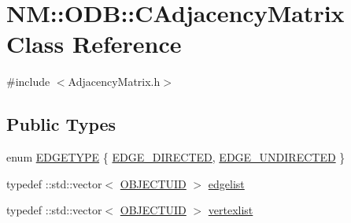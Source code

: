 \hypertarget{class_n_m_1_1_o_d_b_1_1_c_adjacency_matrix}{}\section{N\+M\+:\+:O\+D\+B\+:\+:C\+Adjacency\+Matrix Class Reference}
\label{class_n_m_1_1_o_d_b_1_1_c_adjacency_matrix}


{\ttfamily \#include $<$Adjacency\+Matrix.\+h$>$}

\subsection*{Public Types}
\begin{DoxyCompactItemize}
\item 
enum \hyperlink{class_n_m_1_1_o_d_b_1_1_c_adjacency_matrix_aa4f68c561981e4e158dec4a4a9a97093}{E\+D\+G\+E\+T\+Y\+P\+E} \{ \hyperlink{class_n_m_1_1_o_d_b_1_1_c_adjacency_matrix_aa4f68c561981e4e158dec4a4a9a97093a1817cdb4e014f88e7c6794db0504e9ad}{E\+D\+G\+E\+\_\+\+D\+I\+R\+E\+C\+T\+E\+D}, 
\hyperlink{class_n_m_1_1_o_d_b_1_1_c_adjacency_matrix_aa4f68c561981e4e158dec4a4a9a97093a538d2110c4fc4fac7461bc240c86a89e}{E\+D\+G\+E\+\_\+\+U\+N\+D\+I\+R\+E\+C\+T\+E\+D}
 \}
\item 
typedef \+::std\+::vector$<$ \hyperlink{namespace_n_m_1_1_o_d_b_a262b64fab56baaa96e18bac4ada88265}{O\+B\+J\+E\+C\+T\+U\+I\+D} $>$ \hyperlink{class_n_m_1_1_o_d_b_1_1_c_adjacency_matrix_ab898e602bacf35a9600621408c1fde25}{edgelist}
\item 
typedef \+::std\+::vector$<$ \hyperlink{namespace_n_m_1_1_o_d_b_a262b64fab56baaa96e18bac4ada88265}{O\+B\+J\+E\+C\+T\+U\+I\+D} $>$ \hyperlink{class_n_m_1_1_o_d_b_1_1_c_adjacency_matrix_a483ee6ddd603d9ec66d5f21d0f11ff03}{vertexlist}
\end{DoxyCompactItemize}
